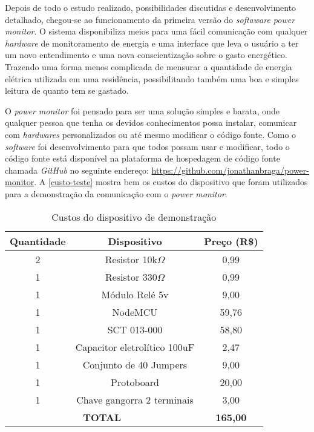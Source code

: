 Depois de todo o estudo realizado, possibilidades discutidas e desenvolvimento detalhado, chegou-se ao  funcionamento da primeira versão
do \textit{softaware power monitor}. O sistema disponibiliza meios para uma fácil comunicação com qualquer \textit{hardware} de monitoramento
de energia e uma interface que leva o usuário a ter um novo entendimento e uma nova conscientização sobre o gasto energético. Trazendo uma forma menos
complicada de mensurar a quantidade de energia elétrica utilizada em uma residência, possibilitando também uma boa e simples leitura de quanto tem se gastado.

O \textit{power monitor} foi pensado para ser uma solução simples e barata, onde qualquer pessoa que tenha os devidos conhecimentos possa 
instalar, comunicar com \textit{hardwares} personalizados ou até mesmo modificar o código fonte. Como o \textit{software} foi desenvolvimento 
para que todos possam usar e modificar, todo o código fonte está disponível na plataforma de hospedagem de código fonte chamada 
\textit{GitHub} no seguinte endereço: \url{https://github.com/jonathanbraga/power-monitor}{}. A \autoref{custo-teste} mostra bem os 
custos do dispositivo que foram utilizados para a demonstração da comunicação com o \textit{power monitor}.


\begin{table}[!ht]
	\centering
	\begin{tabular}{ccc}
		\hline
		\textbf{Quantidade} & \textbf{Dispositivo}               & \textbf{Preço (R\$)}                 \\ \hline
		\rowcolor[HTML]{DDDDDD} 
		2                   & Resistor 10k$\Omega$ & 0,99                                 \\
		1                   & Resistor 330$\Omega$ & 0,99                                 \\
		\rowcolor[HTML]{DDDDDD} 
		1                   & Módulo Relé 5v                     & 9,00                                 \\
		1                   & NodeMCU                            & 59,76                                \\
		\rowcolor[HTML]{DDDDDD} 
		1                   & SCT 013-000                        & 58,80                                \\
		1                   & Capacitor eletrolítico 100uF       & 2,47                                 \\
		\rowcolor[HTML]{DDDDDD} 
		1                   & Conjunto de 40 Jumpers             & 9,00                                 \\
		1                   & Protoboard             & 20,00                                 \\
		1                   & Chave gangorra 2 terminais         & 3,00                                 \\ \hline
		\multicolumn{2}{|c|}{\textbf{TOTAL}}                     & \multicolumn{1}{c|}{\textbf{165,00}} \\ \hline
	\end{tabular}
	\caption{Custos do dispositivo de demonstração}
	\label{custo-teste}
\end{table} 